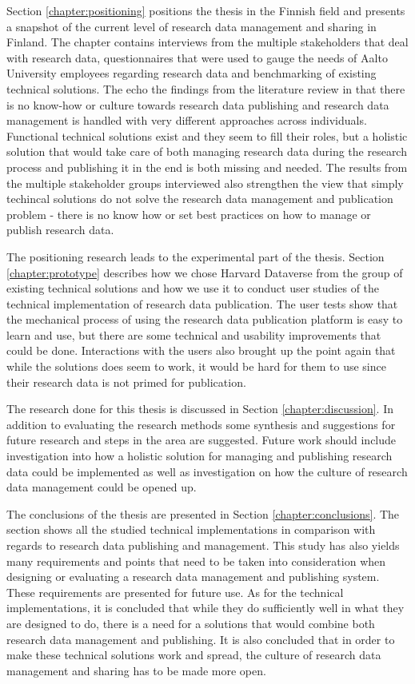 Section \ref{chapter:positioning} positions the thesis in the Finnish field and
presents a snapshot of the current level of research data management and
sharing in Finland. The chapter contains interviews from the multiple
stakeholders that deal with research data, questionnaires that were used to
gauge the needs of Aalto University employees regarding research data and
benchmarking of existing technical solutions. The echo the findings from the
literature review in that there is no know-how or culture towards research
data publishing and research data management is handled with very different
approaches across individuals. Functional technical solutions exist and they
seem to fill their roles, but a holistic solution that would take care of both
managing research data during the research process and publishing it in the end
is both missing and needed. The results from the multiple stakeholder groups
interviewed also strengthen the view that simply techincal solutions do not
solve the research data management and publication problem - there is no
know how or set best practices on how to manage or publish research data.

The positioning research leads to the experimental part of the thesis. Section
\ref{chapter:prototype} describes how we chose Harvard Dataverse from the
group of existing technical solutions and how we use it to conduct user studies of
the technical implementation of research data publication. The user tests
show that the mechanical process of using the research data publication
platform is easy to learn and use, but there are some technical and usability
improvements that could be done. Interactions with the users also brought up
the point again that while the solutions does seem to work, it would be hard
for them to use since their research data is not primed for publication.

The research done for this thesis is discussed in Section
\ref{chapter:discussion}. In addition to evaluating the research methods
some synthesis and suggestions for future research and steps in the area
are suggested. Future work should include investigation into how a
holistic solution for managing and publishing research data could be
implemented as well as investigation on how the culture of research data
management could be opened up.

The conclusions of the thesis are presented in Section
\ref{chapter:conclusions}. The section shows all the studied technical
implementations in comparison with regards to research data publishing
and management. This study has also yields many requirements and points
that need to be taken into consideration when designing or evaluating a
research data management and publishing system. These requirements are
presented for future use. As for the technical implementations, it is
concluded that while they do sufficiently well in what they are designed to
do, there is a need for a solutions that would combine both research data
management and publishing. It is also concluded that in order to make these
technical solutions work and spread, the culture of research data management and sharing
has to be made more open.

